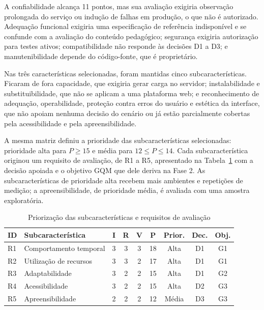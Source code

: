 \documentclass[sigconf, language=english, language=brazilian,natbib=false]{acmart}
\begin{document}
A confiabilidade alcança 11 pontos, mas sua avaliação exigiria observação prolongada do serviço ou indução de falhas em produção, o que não é autorizado. Adequação funcional exigiria uma especificação de referência indisponível e se confunde com a avaliação do conteúdo pedagógico; segurança exigiria autorização para testes ativos; compatibilidade não responde às decisões D1 a D3; e manutenibilidade depende do código-fonte, que é proprietário.

Nas três características selecionadas, foram mantidas cinco subcaracterísticas. Ficaram de fora capacidade, que exigiria gerar carga no servidor; instalabilidade e substituibilidade, que não se aplicam a uma plataforma web; e reconhecimento de adequação, operabilidade, proteção contra erros do usuário e estética da interface, que não apoiam nenhuma decisão do cenário ou já estão parcialmente cobertas pela acessibilidade e pela apreensibilidade.

A mesma matriz definiu a prioridade das subcaracterísticas selecionadas: prioridade alta para $P \geq 15$ e média para $12 \leq P \leq 14$. Cada subcaracterística originou um requisito de avaliação, de R1 a R5, apresentado na Tabela~\ref{tab:priorizacao} com a decisão apoiada e o objetivo GQM que dele deriva na Fase 2. As subcaracterísticas de prioridade alta recebem mais ambientes e repetições de medição; a apreensibilidade, de prioridade média, é avaliada com uma amostra exploratória.

\begin{table}[htbp]
\centering
\caption{Priorização das subcaracterísticas e requisitos de avaliação}
\label{tab:priorizacao}
\scriptsize
\setlength{\tabcolsep}{2.5pt}
\begin{tabular}{llccccccc}
\hline
\textbf{ID} & \textbf{Subcaracterística} & \textbf{I} & \textbf{R} & \textbf{V} & \textbf{P} & \textbf{Prior.} & \textbf{Dec.} & \textbf{Obj.} \\
\hline
R1 & Comportamento temporal & 3 & 3 & 3 & 18 & Alta & D1 & G1 \\
R2 & Utilização de recursos & 3 & 3 & 2 & 17 & Alta & D1 & G1 \\
R3 & Adaptabilidade & 3 & 2 & 2 & 15 & Alta & D1 & G2 \\
R4 & Acessibilidade & 3 & 2 & 2 & 15 & Alta & D2 & G3 \\
R5 & Apreensibilidade & 2 & 2 & 2 & 12 & Média & D3 & G3 \\
\hline
\end{tabular}
\end{table}
\end{document}
